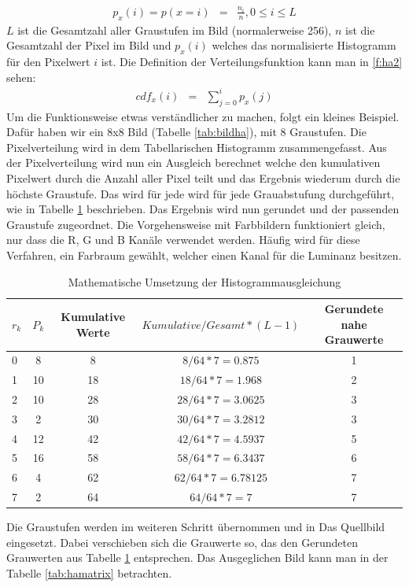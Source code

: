 \begin{eqnarray} \label{f:ha1} p_{x}(i)=p(x=i)&=&\frac{n_{i}}{n}, 0\leq i \leq L \end{eqnarray}
$L$ ist die Gesamtzahl aller Graustufen im Bild (normalerweise 256), $n$ ist die Gesamtzahl der Pixel im Bild und $p_{x}(i)$ welches das normalisierte Histogramm für den Pixelwert $i$ ist. Die Definition der Verteilungsfunktion kann man in \ref{f:ha2} sehen:
\begin{eqnarray} cdf_{x}(i) &=& \sum_{j=0}^i p_{x}(j)\end{eqnarray}
Um die Funktionsweise etwas verständlicher zu machen, folgt ein kleines Beispiel. Dafür haben wir ein 8x8 Bild (Tabelle \ref{tab:bildha}), mit 8 Graustufen. Die Pixelverteilung wird in dem Tabellarischen Histogramm zusammengefasst.  
Aus der Pixelverteilung wird nun ein Ausgleich berechnet welche den kumulativen Pixelwert durch die Anzahl aller Pixel teilt und das Ergebnis wiederum durch die höchste Graustufe. Das wird für jede wird für jede Grauabstufung durchgeführt, wie in Tabelle \ref{tab:haberechnung} beschrieben.
 Das Ergebnis wird nun gerundet und der passenden Graustufe zugeordnet. Die Vorgehensweise mit Farbbildern funktioniert gleich, nur dass die R, G und B Kanäle verwendet werden. Häufig wird für diese Verfahren, ein Farbraum gewählt, welcher einen Kanal für die Luminanz besitzen.
  \begin{table}
  [h]
  \caption{Mathematische Umsetzung der Histogrammausgleichung}
  \label{tab:haberechnung}
  \centering
  \begin{tabular}{|l|c|c|c|c|}
  \hline
  $r_{k}$ & $P_{k}$ & Kumulative Werte & $Kumulative/Gesamt*(L-1)$ & Gerundete nahe Grauwerte\\
  \hline
  0 & 8 & 8 & $8/64*7=0.875$ & 1\\
  \hline
  1 & 10 & 18 & $18/64*7=1.968$ & 2\\
  \hline
  2 & 10 & 28 & $28/64*7=3.0625$ & 3\\
  \hline
  3 & 2 & 30 & $30/64*7=3.2812$ & 3\\
  \hline
  4 & 12 & 42 & $42/64*7=4.5937$ & 5\\
  \hline
  5 & 16 & 58 & $58/64*7=6.3437$ & 6\\
  \hline
  6 & 4 & 62 & $62/64*7=6.78125$ & 7\\
  \hline
  7 & 2 & 64 & $64/64*7=7$ & 7\\
  \hline
  \end{tabular}
  \end{table}
Die Graustufen werden im weiteren Schritt übernommen und in Das Quellbild eingesetzt. Dabei verschieben sich die Grauwerte so, das den Gerundeten Grauwerten aus Tabelle \ref{tab:haberechnung} entsprechen. Das Ausgeglichen Bild kann man in der Tabelle \ref{tab:hamatrix} betrachten. 
